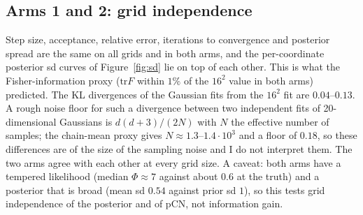 \documentclass[11pt]{article}
\begin{document}
\subsection{Arms 1 and 2: grid independence}\label{sec:arms12}
Step size, acceptance, relative error, iterations to convergence and posterior spread are the same on all grids and in both arms, and the per-coordinate posterior sd curves of Figure~\ref{fig:sd} lie on top of each other. This is what the Fisher-information proxy ($\mathrm{tr}F$ within $1\%$ of the $16^2$ value in both arms) predicted. The KL divergences of the Gaussian fits from the $16^2$ fit are $0.04$--$0.13$. A rough noise floor for such a divergence between two independent fits of 20-dimensional Gaussians is $d(d+3)/(2N)$ with $N$ the effective number of samples; the chain-mean proxy gives $N\approx1.3$--$1.4\cdot10^3$ and a floor of $0.18$, so these differences are of the size of the sampling noise and I do not interpret them. The two arms agree with each other at every grid size. A caveat: both arms have a tempered likelihood (median $\Phi\approx7$ against about $0.6$ at the truth) and a posterior that is broad (mean sd $0.54$ against prior sd $1$), so this tests grid independence of the posterior and of pCN, not information gain.
\end{document}
